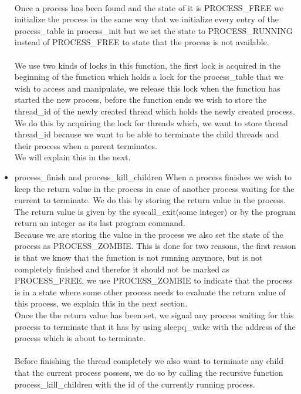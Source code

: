 \documentclass[a4paper,12pt,danish]{report}
\begin{document}
\begin{itemize}
  \\
  Once a process has been found and the state of it is PROCESS\_FREE we initialize the process in the same way that we initialize every entry of the process\_table in process\_init but we set the state to PROCESS\_RUNNING instead of PROCESS\_FREE to state that the process is not available.
  \\
  \\
  We use two kinds of locks in this function, the first lock is acquired in the beginning of the function which holds a lock for the process\_table that we wish to access and manipulate, we release this lock when the function has started the new process, before the function ends we wish to store the thread\_id of the newly created thread which holds the newly created process.
  \\
  We do this by acquiring the lock for threads which, we want to store thread thread\_id because we want to be able to terminate the child threads and their process when a parent terminates.
  \\
  We will explain this in the next.
  \item{process\_finish and process\_kill\_children}
  When a process finishes we wish to keep the return value in the process in case of another process waiting for the current to terminate. We do this by storing the return value in the process.
  \\
  The return value is given by the syscall\_exit(some integer) or by the program return an integer as its last program command.
  \\
  Because we are storing the value in the process we also set the state of the process as PROCESS\_ZOMBIE. This is done for two reasons, the first reason is that we know that the function is not running anymore, but is not completely finished and therefor it should not be marked as PROCESS\_FREE, we use PROCESS\_ZOMBIE to indicate that the process is in a state where some other process needs to evaluate the return value of this process, we explain this in the next section.
  \\
  Once the the return value has been set, we signal any process waiting for this process to terminate that it has by using sleepq\_wake with the address of the process which is about to terminate.
  \\
  \\
  Before finishing the thread completely we also want to terminate any child that the current process possess, we do so by calling the recursive function process\_kill\_children with the id of the currently running process.

\end{itemize}
\end{document}

